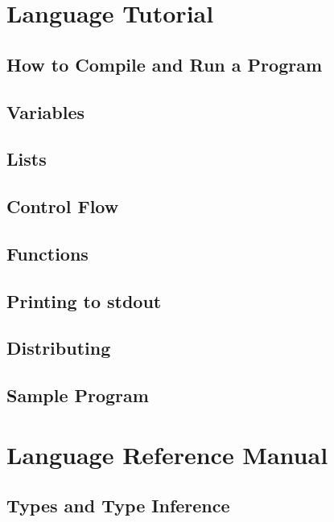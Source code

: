 \documentclass[oneside]{book}
\begin{document}
\chapter{Language Tutorial}

\section{How to Compile and Run a Program}

\section{Variables}

\section{Lists}

\section{Control Flow}

\section{Functions}

\section{Printing to stdout}

\section{Distributing}

\section{Sample Program}


\chapter{Language Reference Manual}
\section{Types and Type Inference}
\end{document}
